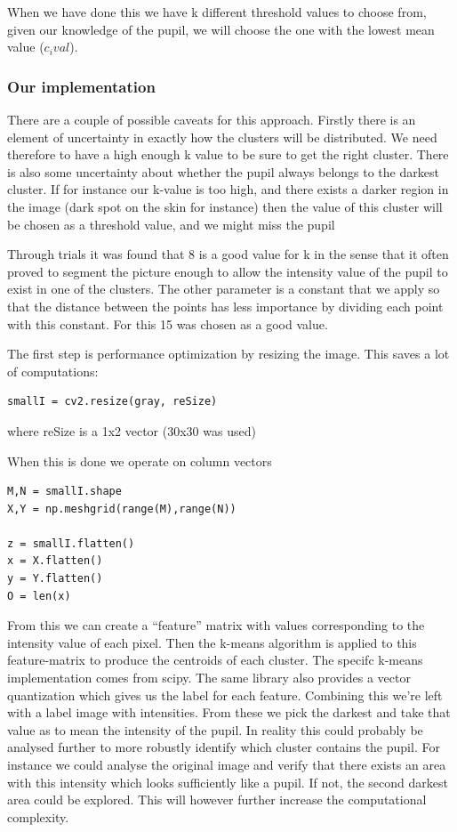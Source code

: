 When we have done this we have k different threshold values to choose
from, given our knowledge of the pupil, we will choose the one with the
lowest mean value ($c_ival$).

\subsubsection{Our implementation}

There are a couple of possible caveats for this approach. Firstly there
is an element of uncertainty in exactly how the clusters will be
distributed. We need therefore to have a high enough k value to be sure
to get the right cluster. There is also some uncertainty about whether
the pupil always belongs to the darkest cluster. If for instance our
k-value is too high, and there exists a darker region in the image (dark
spot on the skin for instance) then the value of this cluster will be
chosen as a threshold value, and we might miss the pupil

Through trials it was found that 8 is a good value for k in the sense
that it often proved to segment the picture enough to allow the
intensity value of the pupil to exist in one of the clusters. The other
parameter is a constant that we apply so that the distance between the
points has less importance by dividing each point with this constant.
For this 15 was chosen as a good value.

The first step is performance optimization by resizing the image. This
saves a lot of computations:

\begin{verbatim}
smallI = cv2.resize(gray, reSize)
\end{verbatim}
where reSize is a 1x2 vector (30x30 was used)

When this is done we operate on column vectors

\begin{verbatim}
M,N = smallI.shape
X,Y = np.meshgrid(range(M),range(N))

z = smallI.flatten()
x = X.flatten()
y = Y.flatten()
O = len(x)
\end{verbatim}
From this we can create a ``feature'' matrix with values corresponding
to the intensity value of each pixel. Then the k-means algorithm is
applied to this feature-matrix to produce the centroids of each cluster.
The specifc k-means implementation comes from scipy. The same library
also provides a vector quantization which gives us the label for each
feature. Combining this we're left with a label image with intensities.
From these we pick the darkest and take that value as to mean the
intensity of the pupil. In reality this could probably be analysed
further to more robustly identify which cluster contains the pupil. For
instance we could analyse the original image and verify that there
exists an area with this intensity which looks sufficiently like a
pupil. If not, the second darkest area could be explored. This will
however further increase the computational complexity.

